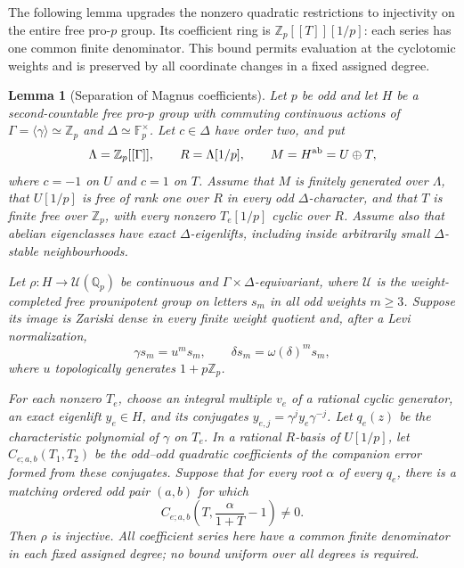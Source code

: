 \documentclass[11pt]{article}
\newtheorem{lemma}[theorem]{Lemma}
\theoremstyle{definition}
\numberwithin{equation}{section}
\begin{document}
The following lemma upgrades the nonzero quadratic restrictions to
injectivity on the entire free pro-$p$ group. Its coefficient ring is
$\mathbb Z_p[[T]][1/p]$: each series has one common finite denominator.
This bound permits evaluation at the cyclotomic weights and is preserved
by all coordinate changes in a fixed assigned degree.
\begin{lemma}[Separation of Magnus coefficients]\label{lem:rational-magnus}
Let $p$ be odd and let $H$ be a second-countable free pro-$p$ group
with commuting continuous actions of
$\Gamma=\langle\gamma\rangle\simeq\mathbb Z_p$ and
$\Delta\simeq\mathbb F_p^\times$. Let $c\in\Delta$ have order two,
and put
\begin{equation}
 \Lambda=\mathbb Z_p[[\Gamma]],\qquad R=\Lambda[1/p],\qquad
 M=H^{\rm ab}=U\oplus T,
\end{equation}
where $c=-1$ on $U$ and $c=1$ on $T$. Assume that $M$ is finitely
generated over $\Lambda$, that $U[1/p]$ is free of rank one over $R$
in every odd $\Delta$-character, and that $T$ is finite free over
$\mathbb Z_p$, with every nonzero $T_e[1/p]$ cyclic over $R$.
Assume also that abelian eigenclasses have exact $\Delta$-eigenlifts,
including inside arbitrarily small $\Delta$-stable neighbourhoods.

Let $\rho:H\to\mathcal U(\mathbb Q_p)$ be continuous and
$\Gamma\times\Delta$-equivariant, where $\mathcal U$ is the
weight-completed free prounipotent group on letters $s_m$ in all odd
weights $m\ge3$. Suppose its image is Zariski dense in every finite
weight quotient and, after a Levi normalization,
\begin{equation}
 \gamma s_m=u^m s_m,\qquad \delta s_m=\omega(\delta)^m s_m,
\end{equation}
where $u$ topologically generates $1+p\mathbb Z_p$.

For each nonzero $T_e$, choose an integral multiple $v_e$ of a rational
cyclic generator, an exact eigenlift $y_e\in H$, and its
conjugates $y_{e,j}=\gamma^j y_e\gamma^{-j}$. Let $q_e(z)$ be the
characteristic polynomial of $\gamma$ on $T_e$. In a rational
$R$-basis of $U[1/p]$, let $C_{e;a,b}(T_1,T_2)$ be the odd--odd
quadratic coefficients of the companion error formed from these conjugates. Suppose that
for every root $\alpha$ of every $q_e$, there is a matching ordered
odd pair $(a,b)$ for which
\begin{equation}
 C_{e;a,b}\left(T,\frac{\alpha}{1+T}-1\right)\ne0.
                                                               \label{eq:gm1}
\end{equation}
Then $\rho$ is injective. All coefficient series here have a common
finite denominator in each fixed assigned degree; no bound uniform
over all degrees is required.
\end{lemma}
\end{document}

